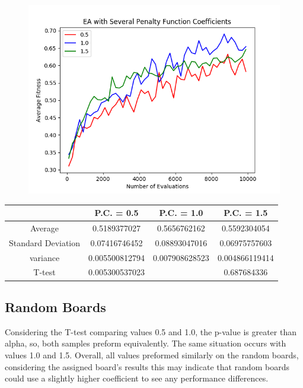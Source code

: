\documentclass{article}
\begin{document}
		\begin{figure}[!htb]
		\centering
		\includegraphics[scale=0.4]{q3_assigned_board.png}
		\end{figure}
		
		
		\begin{center}
		\begin{tabular}{ || c | c | c | c ||}
		\hline
		       & P.C. = 0.5 & P.C. = 1.0 & P.C. = 1.5 \\ 
		 \hline\hline
		 Average & 0.5189377027 &	0.5656762162 &	0.5592304054	 \\ 
		 \hline
		 Standard Deviation &	0.07416746452 &	0.08893047016 &	0.06975757603	 \\
		 \hline
		 variance &	0.005500812794 &	0.007908628523 &	0.004866119414 \\
		 \hline
		 T-test &	0.005300537023	& &	0.687684336 \\
		 \hline
		\end{tabular}
		\end{center}
	
\clearpage
	\subsection{Random Boards}
		Considering the T-test comparing values 0.5 and 1.0, the p-value is greater than alpha, so, both samples preform equivalently. The same situation occurs with values 1.0 and 1.5. Overall, all values preformed similarly on the random boards, considering the assigned board's results this may indicate that random boards could use a 	slightly higher coefficient to see any performance differences.
		
\end{document}
